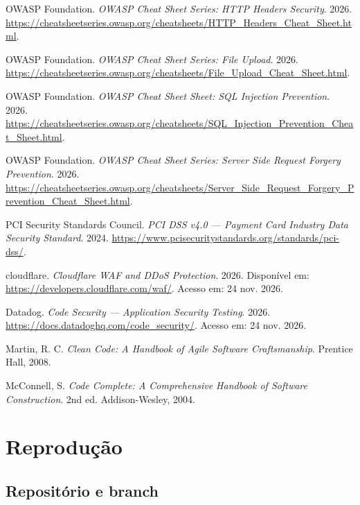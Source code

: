 \documentclass[12pt,a4paper]{article}
\begin{document}
\begin{enumerate}[label={[\arabic*]}]
  \item OWASP Foundation. \textit{OWASP Cheat Sheet Series: HTTP Headers
  Security}. 2026. \url{https://cheatsheetseries.owasp.org/cheatsheets/HTTP_Headers_Cheat_Sheet.html}.

  \item OWASP Foundation. \textit{OWASP Cheat Sheet Series: File Upload}.
  2026. \url{https://cheatsheetseries.owasp.org/cheatsheets/File_Upload_Cheat_Sheet.html}.

  \item OWASP Foundation. \textit{OWASP Cheat Sheet Sheet: SQL Injection
  Prevention}. 2026. \url{https://cheatsheetseries.owasp.org/cheatsheets/SQL_Injection_Prevention_Cheat_Sheet.html}.

  \item OWASP Foundation. \textit{OWASP Cheat Sheet Series: Server Side
  Request Forgery Prevention}. 2026.
  \url{https://cheatsheetseries.owasp.org/cheatsheets/Server_Side_Request_Forgery_Prevention_Cheat_Sheet.html}.

  \item PCI Security Standards Council. \textit{PCI DSS v4.0 --- Payment Card
  Industry Data Security Standard}. 2024.
  \url{https://www.pcisecuritystandards.org/standards/pci-dss/}.

  \item cloudflare. \textit{Cloudflare WAF and DDoS Protection}. 2026.
  Disponível em: \url{https://developers.cloudflare.com/waf/}. Acesso em:
  24 nov. 2026.

  \item Datadog. \textit{Code Security --- Application Security Testing}.
  2026. \url{https://docs.datadoghq.com/code_security/}. Acesso em:
  24 nov. 2026.

  \item Martin, R. C. \textit{Clean Code: A Handbook of Agile Software
  Craftsmanship}. Prentice Hall, 2008.

  \item McConnell, S. \textit{Code Complete: A Comprehensive Handbook of
  Software Construction}. 2nd ed. Addison-Wesley, 2004.
\end{enumerate}

\appendix
\section{Reprodução}
\label{app:reproducao}

\subsection{Repositório e branch}
\end{document}
